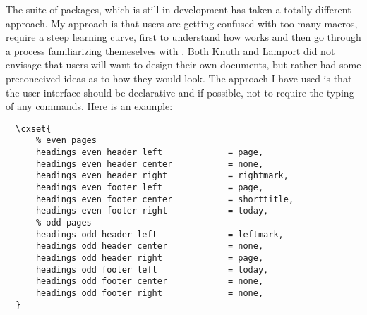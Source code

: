 The  suite of packages, which is still in development has taken a totally different approach. My approach is that users are getting confused with too many macros, require a steep learning curve, first to understand how \tex works and then go through a process familiarizing themeselves with \latexe. Both Knuth and Lamport did not envisage that users will want to design their own documents, but rather had some preconceived ideas as to how they would look. The approach I have used is that the user interface should be declarative and if possible, not to require the typing of any commands. Here is an example:

\begin{verbatim}
  \cxset{
      % even pages
      headings even header left             = page,
      headings even header center           = none,
      headings even header right            = rightmark, 
      headings even footer left             = page,
      headings even footer center           = shorttitle,
      headings even footer right            = today,
      % odd pages
      headings odd header left              = leftmark,
      headings odd header center            = none,
      headings odd header right             = page, 
      headings odd footer left              = today,
      headings odd footer center            = none,
      headings odd footer right             = none, 
  }
\end{verbatim}


